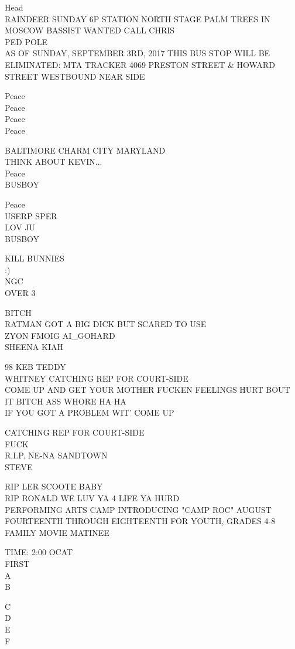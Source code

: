 \documentclass[10pt,letterpaper]{article}
\begin{document}
Head\\
RAINDEER SUNDAY 6P STATION NORTH STAGE PALM TREES IN MOSCOW BASSIST WANTED CALL CHRIS\\
PED POLE\\
AS OF SUNDAY, SEPTEMBER 3RD, 2017 THIS BUS STOP WILL BE ELIMINATED: MTA TRACKER 4069 PRESTON STREET \& HOWARD STREET WESTBOUND NEAR SIDE

Peace\\
Peace\\
Peace\\
Peace

BALTIMORE CHARM CITY MARYLAND\\
THINK ABOUT KEVIN...\\
Peace\\
BUSBOY

Peace\\
USERP SPER\\
LOV JU\\
BUSBOY

KILL BUNNIES\\
:)\\
NGC\\
OVER 3

BITCH\\
RATMAN GOT A BIG DICK BUT SCARED TO USE\\
ZYON FMOIG AI\_GOHARD\\
SHEENA KIAH

98 KEB TEDDY\\
WHITNEY CATCHING REP FOR COURT{-}SIDE\\
COME UP AND GET YOUR MOTHER FUCKEN FEELINGS HURT BOUT IT BITCH ASS WHORE HA HA\\
IF YOU GOT A PROBLEM WIT' COME UP

CATCHING REP FOR COURT{-}SIDE\\
FUCK\\
R.I.P. NE{-}NA SANDTOWN\\
STEVE

RIP LER SCOOTE BABY\\
RIP RONALD WE LUV YA 4 LIFE YA HURD\\
PERFORMING ARTS CAMP INTRODUCING "CAMP ROC" AUGUST FOURTEENTH THROUGH EIGHTEENTH FOR YOUTH, GRADES 4{-}8\\
FAMILY MOVIE MATINEE

TIME: 2:00 OCAT\\
FIRST\\
A\\
B

C\\
D\\
E\\
F
\end{document}
